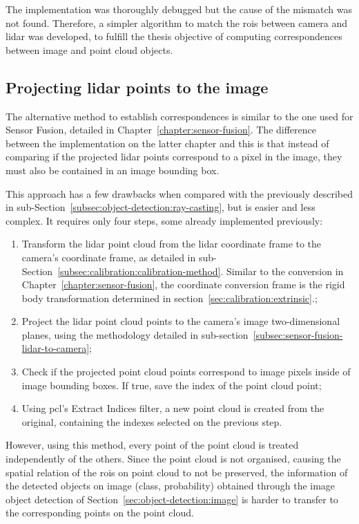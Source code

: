 The implementation was thoroughly debugged but the cause of the mismatch was not found. Therefore, a simpler algorithm to match the \acp{roi} between camera and \ac{lidar} was developed, to fulfill the thesis objective of computing correspondences between image and point cloud objects.


\subsection{Projecting \ac{lidar} points to the image}
\label{subsec:object-detection:projection-correspondences}

The alternative method to establish correspondences is similar to the one used for Sensor Fusion, detailed in Chapter~\ref{chapter:sensor-fusion}. The difference between the implementation on the latter chapter and this is that instead of comparing if the projected \ac{lidar} points correspond to a pixel in the image, they must also be contained in an image bounding box. 

This approach has a few drawbacks when compared with the previously described in sub-Section~\ref{subsec:object-detection:ray-casting}, but is easier and less complex. It requires only four steps, some already implemented previously:

\begin{enumerate}
	\item Transform the \ac{lidar} point cloud from the \ac{lidar} coordinate frame to the camera's coordinate frame, as detailed in sub-Section~\ref{subsec:calibration:calibration-method}. Similar to the conversion in Chapter~\ref{chapter:sensor-fusion}, the coordinate conversion frame is the rigid body transformation determined in section~\ref{sec:calibration:extrinsic}.;
	\item Project the \ac{lidar} point cloud points to the camera's image two-dimensional planes, using the methodology detailed in sub-section~\ref{subsec:sensor-fusion-lidar-to-camera};
	\item Check if the projected point cloud points correspond to image pixels inside of image bounding boxes. If true, save the index of the point cloud point;
	\item Using \ac{pcl}'s Extract Indices filter, a new point cloud is created from the original, containing the indexes selected on the previous step.
\end{enumerate}

However, using this method, every point of the point cloud is treated independently of the others. Since the point cloud is not organised, causing the spatial relation of the \acp{roi} on point cloud to not be preserved, the information of the detected objects on image (class, probability) obtained through the image object detection of Section~\ref{sec:object-detection:image} is harder to transfer to the corresponding points on the point cloud.


